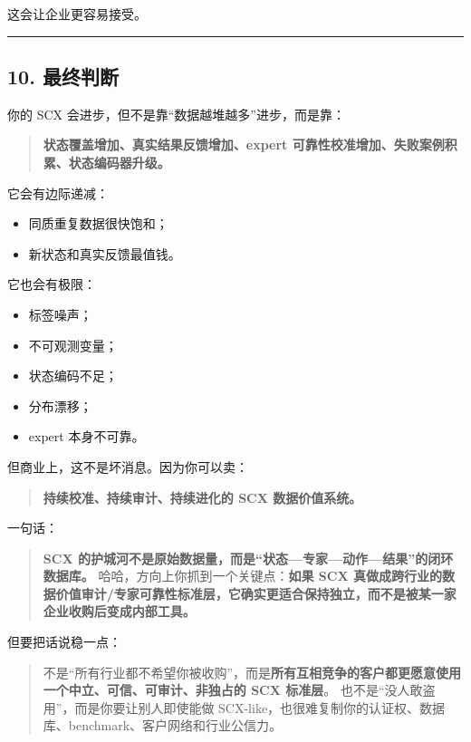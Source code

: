 \documentclass[
  12pt,
]{ctexart}
\providecommand{\tightlist}{%
  \setlength{\itemsep}{0pt}\setlength{\parskip}{0pt}}
\begin{document}
这会让企业更容易接受。

\begin{center}\rule{0.5\linewidth}{0.5pt}\end{center}

\subsection{10. 最终判断}\label{ux6700ux7ec8ux5224ux65ad-2}

你的 SCX 会进步，但不是靠``数据越堆越多''进步，而是靠：

\begin{quote}
\textbf{状态覆盖增加、真实结果反馈增加、expert
可靠性校准增加、失败案例积累、状态编码器升级。}
\end{quote}

它会有边际递减：

\begin{itemize}
\tightlist
\item
  同质重复数据很快饱和；
\item
  新状态和真实反馈最值钱。
\end{itemize}

它也会有极限：

\begin{itemize}
\tightlist
\item
  标签噪声；
\item
  不可观测变量；
\item
  状态编码不足；
\item
  分布漂移；
\item
  expert 本身不可靠。
\end{itemize}

但商业上，这不是坏消息。因为你可以卖：

\begin{quote}
\textbf{持续校准、持续审计、持续进化的 SCX 数据价值系统。}
\end{quote}

一句话：

\begin{quote}
\textbf{SCX
的护城河不是原始数据量，而是``状态---专家---动作---结果''的闭环数据库。}
哈哈，方向上你抓到一个关键点：\textbf{如果 SCX
真做成跨行业的数据价值审计/专家可靠性标准层，它确实更适合保持独立，而不是被某一家企业收购后变成内部工具。}
\end{quote}

但要把话说稳一点：

\begin{quote}
不是``所有行业都不希望你被收购''，而是\textbf{所有互相竞争的客户都更愿意使用一个中立、可信、可审计、非独占的
SCX 标准层}。 也不是``没人敢盗用''，而是你要让别人即使能做
SCX-like，也很难复制你的认证权、数据库、benchmark、客户网络和行业公信力。
\end{quote}
\end{document}
